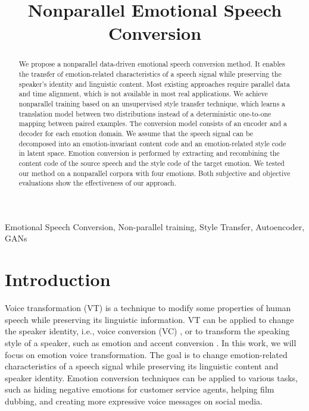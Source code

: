 \documentclass{article}
\title{Nonparallel Emotional Speech Conversion}
\begin{document}
%
\maketitle
%
\begin{abstract}
We propose a nonparallel data-driven emotional speech conversion method. It enables the transfer of emotion-related characteristics of a speech signal while preserving the speaker's identity and linguistic content. Most existing approaches require parallel data and time alignment, which is not available in most real applications. We achieve nonparallel training based on an unsupervised style transfer technique, which learns a translation model between two distributions instead of a deterministic one-to-one mapping between paired examples. The conversion model consists of an encoder and a decoder for each emotion domain. We assume that the speech signal can be decomposed into an emotion-invariant content code and an emotion-related style code in latent space. Emotion conversion is performed by extracting and recombining the content code of the source speech and the style code of the target emotion. We tested our method on a nonparallel corpora with four emotions. Both subjective and objective evaluations show the effectiveness of our approach.
\end{abstract}

%
\begin{keywords}
Emotional Speech Conversion, Non-parallel training, Style Transfer, Autoencoder, GANs
\end{keywords}
%



\section{Introduction}
\label{sec:intro}
Voice transformation (VT) is a technique to modify some properties of human speech while preserving its linguistic information. VT can be applied to change the speaker identity, i.e., voice conversion (VC) \cite{mohammadi2017overview}, or to transform the speaking style of a speaker, such as emotion and accent conversion \cite{zhao2018accent}. In this work, we will focus on emotion voice transformation. The goal is to change emotion-related characteristics of a speech signal while preserving its linguistic content and speaker identity. Emotion conversion techniques can be applied to various tasks, such as hiding negative emotions for customer service agents, helping film dubbing, and creating more expressive voice messages on social media.
\end{document}
